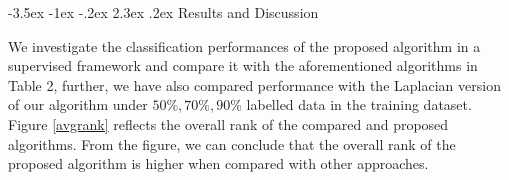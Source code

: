 \documentclass[12pt,a4paper,oneside,english]{report}
\makeatletter
\renewcommand\subsection{\@startsection {subsection}{1}{\z@}%
                                   {-3.5ex \@plus -1ex \@minus -.2ex}%
                                   {2.3ex \@plus.2ex}%
                                   {\centering\normalfont\Large\bfseries}}
\renewcommand{\tabcolsep}{0.5cm}
\renewcommand{\arraystretch}{1.5}
\makeatother
\begin{document}

\subsection{Results and  Discussion}
\setlength{\tabcolsep}{1pt} %
\renewcommand{\arraystretch}{1} %

We investigate the classification performances of the proposed algorithm in a supervised framework and compare it with the aforementioned algorithms in Table 2, further, we have also compared performance with the Laplacian version of our algorithm under \( 50 \%, 70 \%, 90 \% \) labelled data in the training dataset.
Figure \ref{avgrank} reflects the overall rank of the compared and proposed algorithms. From the figure, we can conclude that the overall rank of the proposed algorithm is higher when compared with other approaches.
\end{document}
